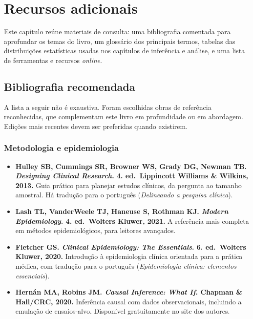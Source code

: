 \documentclass[
]{book}
\providecommand{\tightlist}{%
  \setlength{\itemsep}{0pt}\setlength{\parskip}{0pt}}
\begin{document}
\chapter{Recursos adicionais}\label{recursos-adicionais}

Este capítulo reúne materiais de consulta: uma bibliografia comentada para aprofundar os temas do livro, um glossário dos principais termos, tabelas das distribuições estatísticas usadas nos capítulos de inferência e análise, e uma lista de ferramentas e recursos \emph{online}.

\section{Bibliografia recomendada}\label{bibliografia-recomendada}

A lista a seguir não é exaustiva. Foram escolhidas obras de referência reconhecidas, que complementam este livro em profundidade ou em abordagem. Edições mais recentes devem ser preferidas quando existirem.

\subsection{Metodologia e epidemiologia}\label{metodologia-e-epidemiologia}

\begin{itemize}
\tightlist
\item
  \textbf{Hulley SB, Cummings SR, Browner WS, Grady DG, Newman TB. \emph{Designing Clinical Research}. 4. ed.~Lippincott Williams \& Wilkins, 2013.} Guia prático para planejar estudos clínicos, da pergunta ao tamanho amostral. Há tradução para o português (\emph{Delineando a pesquisa clínica}).
\item
  \textbf{Lash TL, VanderWeele TJ, Haneuse S, Rothman KJ. \emph{Modern Epidemiology}. 4. ed.~Wolters Kluwer, 2021.} A referência mais completa em métodos epidemiológicos, para leitores avançados.
\item
  \textbf{Fletcher GS. \emph{Clinical Epidemiology: The Essentials}. 6. ed.~Wolters Kluwer, 2020.} Introdução à epidemiologia clínica orientada para a prática médica, com tradução para o português (\emph{Epidemiologia clínica: elementos essenciais}).
\item
  \textbf{Hernán MA, Robins JM. \emph{Causal Inference: What If}. Chapman \& Hall/CRC, 2020.} Inferência causal com dados observacionais, incluindo a emulação de ensaios-alvo. Disponível gratuitamente no site dos autores.
\end{itemize}
\end{document}
